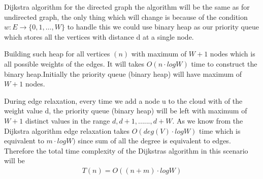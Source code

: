 \documentclass[a4paper,11pt]{article}
\theoremstyle{quest}
\newenvironment{solution}[2][Solution]{\begin{trivlist}
		\item[\hskip \labelsep {\bfseries #1}\hskip \labelsep {\bfseries #2.}]}{\end{trivlist}}
\begin{document}
\begin{solution}3
	Dijkstra algorithm for the directed graph the algorithm will be the same as for undirected graph, the only thing which will change is because of the condition $w :	E \rightarrow \{ 0, 1, \dots, W \}$ to handle this we could use binary heap as our priority queue which stores all the vertices with distance d at a single node. 
	
	Building such heap for all vertices $(n)$ with maximum of $W+1$ nodes which is all possible weights of the edges. It will takes ${O(n\cdot logW)}$ time to construct the binary heap.Initially the priority queue (binary heap) will have maximum of $W+1$ nodes. 
	
	During edge relaxation, every time we add a node u to the cloud with of the weight value d, the priority queue (binary heap) will be left with maximum of $W+1$ distinct values in the range $d, d+1, ......, d+W$. As we know from the Dijkstra algorithm edge relaxation takes ${O(deg(V)\cdot logW)}$ time which is equivalent to ${m\cdot logW)}$ since sum of all the degree is equivalent to edges. Therefore the total time complexity of the Dijkstra\textsc{}s algorithm in this scenario will be 
	\begin{align*}
	\boxed{{T(n) = O((n+m)\cdot logW)}}
	\end{align*}
\end{solution}
\end{document}
